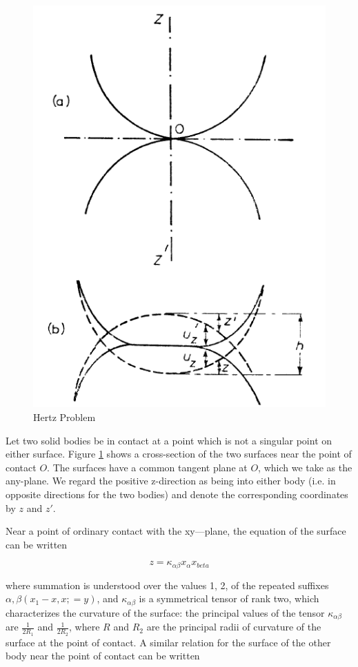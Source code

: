 \begin{figure}[H]
\includegraphics[scale=0.5]{../images/Intro/hertz.png}
\caption{Hertz Problem}
\label{fig:hertzfigure}
\end{figure}

Let two solid bodies be in contact at a point which is not a singular point on either surface. Figure \ref{fig:hertzfigure} shows a cross-section of the two surfaces near the point of contact $O$. The surfaces have a common tangent plane at $O$, which we take as the any-plane. We regard the positive z-direction as being into either body (i.e. in opposite directions for the two bodies) and denote the corresponding coordinates by $z$ and $z'$.

Near a point of ordinary contact with the xy—plane, the equation of the surface can be written

\begin{equation}
z = \kappa_{\alpha\beta}x_{\alpha}x_{beta}
\label{eq:contacteq1}
\end{equation}

where summation is understood over the values 1, 2, of the repeated suffixes $\alpha, \beta (x_{1} - x, x; = y)$, and $\kappa_{\alpha\beta}$ is a symmetrical tensor of rank two, which characterizes the curvature of the surface: the principal values of the tensor $\kappa_{\alpha\beta}$ are $\frac{1}{2R_{1}}$ and $\frac{1}{2R_{2}}$, where $R$ and $R_{2}$ are the principal radii of curvature
of the surface at the point of contact. A similar relation for the surface of the other body near the point of contact can be written

